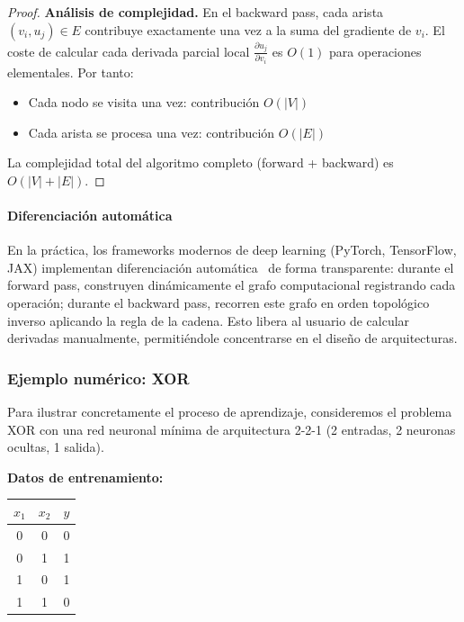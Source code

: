 \begin{proof}
	\textbf{Análisis de complejidad.}
	En el backward pass, cada arista \((v_i, u_j) \in E\) contribuye exactamente una vez a la suma del gradiente de \(v_i\). El coste de calcular cada derivada parcial local \(\frac{\partial u_j}{\partial v_i}\) es \(O(1)\) para operaciones elementales. Por tanto:
	\begin{itemize}
		\item Cada nodo se visita una vez: contribución \(O(|V|)\)
		\item Cada arista se procesa una vez: contribución \(O(|E|)\)
	\end{itemize}

	La complejidad total del algoritmo completo (forward + backward) es \(O(|V| + |E|)\).
\end{proof}

\paragraph{Diferenciación automática}
En la práctica, los frameworks modernos de deep learning (PyTorch, TensorFlow, JAX) implementan diferenciación automática~\citep{Neidinger2010IntroductionTA} de forma transparente: durante el forward pass, construyen dinámicamente el grafo computacional registrando cada operación; durante el backward pass, recorren este grafo en orden topológico inverso aplicando la regla de la cadena. Esto libera al usuario de calcular derivadas manualmente, permitiéndole concentrarse en el diseño de arquitecturas.

\subsubsection{Ejemplo numérico: XOR}

Para ilustrar concretamente el proceso de aprendizaje, consideremos el problema XOR con una red neuronal mínima de arquitectura 2-2-1 (2 entradas, 2 neuronas ocultas, 1 salida).

\textbf{Datos de entrenamiento:}
\begin{center}
	\begin{tabular}{cc|c}
		\(x_1\) & \(x_2\) & \(y\) \\
		\hline
		0       & 0       & 0     \\
		0       & 1       & 1     \\
		1       & 0       & 1     \\
		1       & 1       & 0     \\
	\end{tabular}
\end{center}

